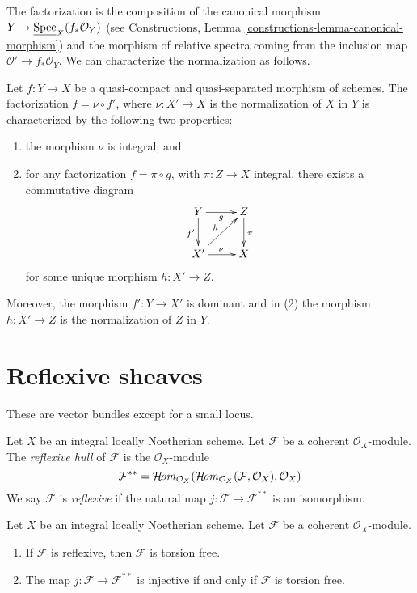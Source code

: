 \noindent
The factorization is the composition of the canonical morphism
$Y \to \underline{\mathop{\mathrm{Spec}}}_X(f_*\mathcal{O}_Y)$ (see
Constructions, Lemma
\ref{constructions-lemma-canonical-morphism})
and the morphism of relative spectra coming from the inclusion map
$\mathcal{O}' \to f_*\mathcal{O}_Y$. We can characterize the
normalization as follows.

\begin{lemma}
\label{lemma-characterize-normalization}
Let $f : Y \to X$ be a quasi-compact and quasi-separated morphism of schemes.
The factorization $f = \nu \circ f'$, where $\nu : X' \to X$ is the
normalization of $X$ in $Y$ is characterized by the following
two properties:
\begin{enumerate}
\item the morphism $\nu$ is integral, and
\item for any factorization $f = \pi \circ g$, with $\pi : Z \to X$
integral, there exists a commutative diagram
$$
\xymatrix{
Y \ar[d]_{f'} \ar[r]_g & Z \ar[d]^\pi \\
X' \ar[ru]^h \ar[r]^\nu & X
}
$$
for some unique morphism $h : X' \to Z$.
\end{enumerate}
Moreover, the morphism $f' : Y \to X'$ is dominant and in (2) the
morphism $h : X' \to Z$ is the normalization of $Z$ in $Y$.
\end{lemma}



\section{Reflexive sheaves}
\label{section-reflexive-sheaves}

\begin{slogan}
These are vector bundles except for a small locus.
\end{slogan}

\begin{definition}
\label{definition-reflexive}
Let $X$ be an integral locally Noetherian scheme. Let $\mathcal{F}$
be a coherent $\mathcal{O}_X$-module. The {\it reflexive hull}
of $\mathcal{F}$ is the $\mathcal{O}_X$-module
$$
\mathcal{F}^{**} = \mathop{\mathcal{H}\!\mathit{om}}\nolimits_{\mathcal{O}_X}(
\mathop{\mathcal{H}\!\mathit{om}}\nolimits_{\mathcal{O}_X}(\mathcal{F}, \mathcal{O}_X), \mathcal{O}_X)
$$
We say $\mathcal{F}$ is {\it reflexive} if the natural map
$j : \mathcal{F} \longrightarrow \mathcal{F}^{**}$
is an isomorphism.
\end{definition}

\begin{lemma}
\label{lemma-reflexive-torsion-free}
Let $X$ be an integral locally Noetherian scheme. Let $\mathcal{F}$
be a coherent $\mathcal{O}_X$-module.
\begin{enumerate}
\item If $\mathcal{F}$ is reflexive, then $\mathcal{F}$ is torsion free.
\item The map $j : \mathcal{F} \longrightarrow \mathcal{F}^{**}$
is injective if and only if $\mathcal{F}$ is torsion free.
\end{enumerate}
\end{lemma}

